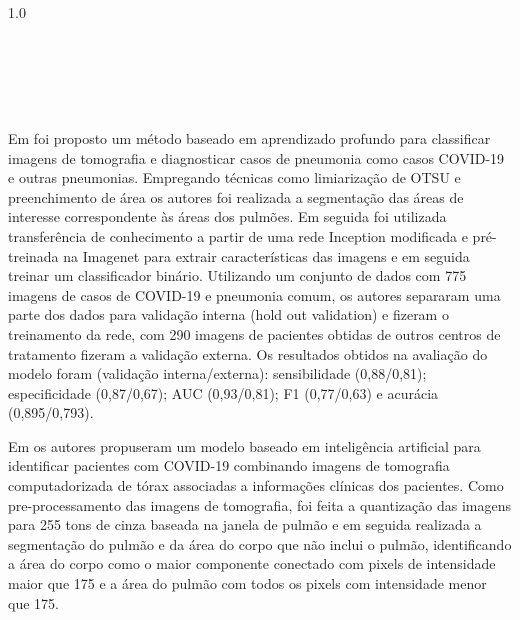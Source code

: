 \begin{table}[ht]
\begin{tabularx}{1.0\textwidth}

\bottomrule

 \\
 
 \\

 \\

 \\

\end{tabularx}
\end{table}


Em \cite{wang2021deep} foi proposto um método baseado em aprendizado profundo para classificar imagens de tomografia e diagnosticar casos de pneumonia como casos COVID-19 e outras pneumonias.  Empregando técnicas como limiarização de OTSU e preenchimento de área os autores foi realizada a segmentação das áreas de interesse correspondente às áreas dos pulmões. Em seguida foi utilizada transferência de conhecimento a partir de uma rede Inception \cite{szegedy2015going} modificada e pré-treinada na Imagenet \cite{deng2009imagenet} para extrair características das imagens e em seguida treinar um classificador binário. Utilizando um conjunto de dados com 775 imagens de casos de COVID-19 e pneumonia comum, os autores separaram uma parte dos dados para validação interna (hold out validation) e fizeram o treinamento da rede, com 290 imagens de pacientes obtidas de outros centros de tratamento fizeram a validação externa. Os resultados obtidos na avaliação do modelo foram (validação interna/externa): sensibilidade (0,88/0,81); especificidade (0,87/0,67); AUC (0,93/0,81); F1 (0,77/0,63) e acurácia (0,895/0,793).

Em \cite{mei2020artificial} os autores propuseram um modelo baseado em inteligência artificial para identificar pacientes com COVID-19 combinando imagens de tomografia computadorizada de tórax associadas a informações clínicas dos pacientes. Como pre-processamento das imagens de tomografia, foi feita a quantização das imagens para 255 tons de cinza baseada na janela de pulmão e em seguida realizada a segmentação do pulmão e da área do corpo que não inclui o pulmão, identificando a área do corpo como o maior componente conectado com pixels de intensidade maior que 175 e a área do pulmão com todos os pixels com intensidade menor que 175. 

